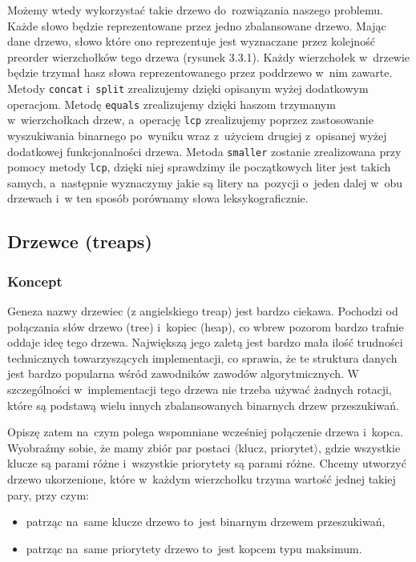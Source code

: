 \documentclass[declaration,shortabstract]{iithesis}
\theoremstyle{definition} \newtheorem{definition}{Definicja}[chapter]
\theoremstyle{remark} \newtheorem{remark}[definition]{Obserwacja}
\theoremstyle{plain} \newtheorem{theorem}[definition]{Twierdzenie}
\theoremstyle{remark} \newtheorem{example}{Przykład}[definition]
\theoremstyle{plain} \newtheorem{lemma}[definition]{Lemat}
\begin{document}
Możemy wtedy wykorzystać takie drzewo do~rozwiązania naszego problemu. Każde słowo będzie reprezentowane przez jedno zbalansowane drzewo. Mając dane drzewo, słowo które ono reprezentuje jest wyznaczane przez kolejność preorder wierzchołków tego drzewa (rysunek 3.3.1). Każdy wierzchołek w~drzewie będzie trzymał hasz słowa reprezentowanego przez poddrzewo w~nim zawarte. Metody \texttt{concat} i~\texttt{split} zrealizujemy dzięki opisanym wyżej dodatkowym operacjom. Metodę \texttt{equals} zrealizujemy dzięki haszom trzymanym w~wierzchołkach drzew, a~operację \texttt{lcp} zrealizujemy poprzez zastosowanie wyszukiwania binarnego po~wyniku wraz z~użyciem drugiej z~opisanej wyżej dodatkowej funkcjonalności drzewa. Metoda \texttt{smaller} zostanie zrealizowana przy pomocy metody \texttt{lcp}, dzięki niej sprawdzimy ile początkowych liter jest takich samych, a~następnie wyznaczymy jakie są litery na~pozycji o~jeden dalej w~obu drzewach i~w ten sposób porównamy słowa leksykograficznie.

\subsection{Drzewce (treaps)}

\subsubsection{Koncept}

Geneza nazwy drzewiec (z angielskiego treap) jest bardzo ciekawa. Pochodzi od połączania słów drzewo (tree) i~kopiec (heap), co wbrew pozorom bardzo trafnie oddaje ideę tego drzewa. Największą jego zaletą jest bardzo mała ilość trudności technicznych towarzyszących implementacji, co sprawia, że te struktura danych jest bardzo popularna wśród zawodników zawodów algorytmicznych. W szczególności w~implementacji tego drzewa nie trzeba używać żadnych rotacji, które są podstawą wielu innych zbalansowanych binarnych drzew przeszukiwań.

Opiszę zatem na~czym polega wspomniane wcześniej połączenie drzewa i~kopca. Wyobraźmy sobie, że mamy zbiór par postaci $\langle$klucz, priorytet$\rangle$, gdzie wszystkie klucze są parami różne i~wszystkie priorytety są parami różne. Chcemy utworzyć drzewo ukorzenione, które w~każdym wierzchołku trzyma wartość jednej takiej pary, przy czym:
\begin{itemize}
    \item patrząc na~same klucze drzewo to~jest binarnym drzewem przeszukiwań,
    \item patrząc na~same priorytety drzewo to~jest kopcem typu maksimum.
\end{itemize}
\end{document}
